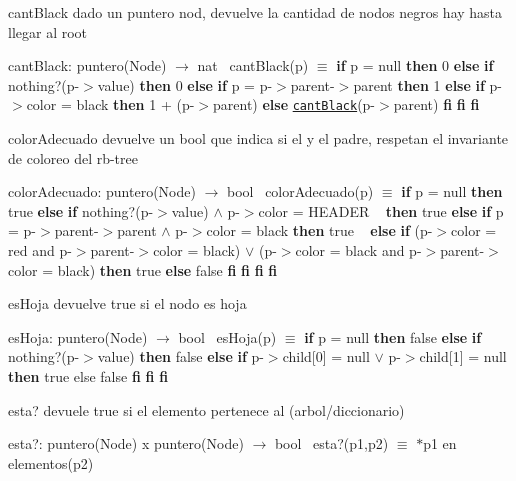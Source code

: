 \begin{DoxyParagraph}{cant\+Black}
dado un puntero nod, devuelve la cantidad de nodos negros hay hasta llegar al root

cant\+Black\+: puntero(\+Node) $\to$ nat~\newline
 cant\+Black(p) $\equiv$ {\bfseries if} p = null {\bfseries then} 0 {\bfseries else} {\bfseries if} nothing?(p-\/$>$value) {\bfseries then} 0 {\bfseries else} {\bfseries if} p = p-\/$>$parent-\/$>$parent {\bfseries then} 1 {\bfseries else} {\bfseries if} p-\/$>$color = black {\bfseries then} 1 + (p-\/$>$parent) {\bfseries else} \href{axiomas.html#cantBlack}{\tt cant\+Black}(p-\/$>$parent) {\bfseries fi} {\bfseries fi} {\bfseries fi} 
\end{DoxyParagraph}


\begin{DoxyParagraph}{color\+Adecuado}
devuelve un bool que indica si el y el padre, respetan el invariante de coloreo del rb-\/tree

color\+Adecuado\+: puntero(\+Node) $\to$ bool~\newline
 color\+Adecuado(p) $\equiv$ {\bfseries if} p = null {\bfseries then} true {\bfseries else} {\bfseries if} nothing?(p-\/$>$value) $\land$ p-\/$>$color = H\+E\+A\+D\+ER ~\newline
 {\bfseries then} true {\bfseries else} {\bfseries if} p = p-\/$>$parent-\/$>$parent $\land$ p-\/$>$color = black {\bfseries then} true ~\newline
 {\bfseries else} {\bfseries if} (p-\/$>$color = red and p-\/$>$parent-\/$>$color = black) $\lor$ (p-\/$>$color = black and p-\/$>$parent-\/$>$color = black) {\bfseries then} true {\bfseries else} false {\bfseries fi} {\bfseries fi} {\bfseries fi} {\bfseries fi} 
\end{DoxyParagraph}


\begin{DoxyParagraph}{es\+Hoja}
devuelve true si el nodo es hoja

es\+Hoja\+: puntero(\+Node) $\to$ bool~\newline
 es\+Hoja(p) $\equiv$ {\bfseries if} p = null {\bfseries then} false {\bfseries else} {\bfseries if} nothing?(p-\/$>$value) {\bfseries then} false {\bfseries else} {\bfseries if} p-\/$>$child\mbox{[}0\mbox{]} = null $\lor$ p-\/$>$child\mbox{[}1\mbox{]} = null {\bfseries then} true else false {\bfseries fi} {\bfseries fi} {\bfseries fi} 
\end{DoxyParagraph}


\begin{DoxyParagraph}{esta?}
devuele true si el elemento pertenece al (arbol/diccionario)

esta?\+: puntero(\+Node) x puntero(\+Node) $\to$ bool~\newline
 esta?(p1,p2) $\equiv$ $\ast$p1 en elementos(p2) 
\end{DoxyParagraph}



